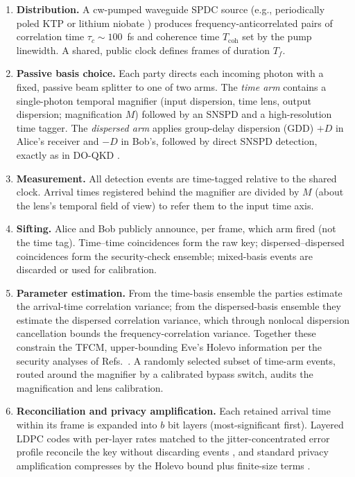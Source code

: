 \documentclass[11pt]{article}
\begin{document}
\begin{enumerate}
\item \textbf{Distribution.} A cw-pumped waveguide SPDC source (e.g., periodically poled KTP or lithium niobate \cite{Zhong2012}) produces frequency-anticorrelated pairs of correlation time $\tau_c \sim 100$~fs and coherence time $T_{\mathrm{coh}}$ set by the pump linewidth. A shared, public clock defines frames of duration $T_f$.
\item \textbf{Passive basis choice.} Each party directs each incoming photon with a fixed, passive beam splitter to one of two arms. The \emph{time arm} contains a single-photon temporal magnifier (input dispersion, time lens, output dispersion; magnification $M$) followed by an SNSPD and a high-resolution time tagger. The \emph{dispersed arm} applies group-delay dispersion (GDD) $+D$ in Alice's receiver and $-D$ in Bob's, followed by direct SNSPD detection, exactly as in DO-QKD \cite{Mower2013}.
\item \textbf{Measurement.} All detection events are time-tagged relative to the shared clock. Arrival times registered behind the magnifier are divided by $M$ (about the lens's temporal field of view) to refer them to the input time axis.
\item \textbf{Sifting.} Alice and Bob publicly announce, per frame, which arm fired (not the time tag). Time--time coincidences form the raw key; dispersed--dispersed coincidences form the security-check ensemble; mixed-basis events are discarded or used for calibration.
\item \textbf{Parameter estimation.} From the time-basis ensemble the parties estimate the arrival-time correlation variance; from the dispersed-basis ensemble they estimate the dispersed correlation variance, which through nonlocal dispersion cancellation \cite{Franson1992} bounds the frequency-correlation variance. Together these constrain the TFCM, upper-bounding Eve's Holevo information per the security analyses of Refs.~\cite{Zhang2014,Niu2016}. A randomly selected subset of time-arm events, routed around the magnifier by a calibrated bypass switch, audits the magnification and lens calibration.
\item \textbf{Reconciliation and privacy amplification.} Each retained arrival time within its frame is expanded into $b$ bit layers (most-significant first). Layered LDPC codes with per-layer rates matched to the jitter-concentrated error profile reconcile the key without discarding events \cite{Zhong2015,Boutros2023}, and standard privacy amplification compresses by the Holevo bound plus finite-size terms \cite{ShorPreskill2000,Niu2016}.
\end{enumerate}
\end{document}

